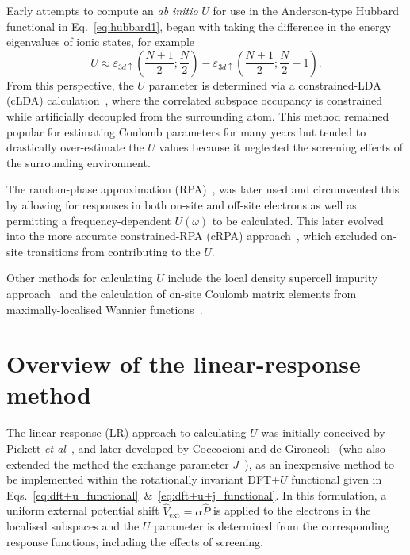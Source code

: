 Early attempts to compute an \emph{ab initio} $U$ 
for use in the Anderson-type Hubbard functional 
in Eq.~\eqref{eq:hubbard1}, 
began with taking the difference in the energy eigenvalues of ionic states, 
for example~\cite{PhysRevB.43.7570} 
%
\begin{equation}
U\approx\varepsilon_{3d\uparrow}\left(\frac{N+1}{2};\frac{N}{2}\right)-\varepsilon_{3d\uparrow}\left(\frac{N+1}{2};\frac{N}{2}-1\right).
\end{equation}
%
From this perspective, 
the $U$ parameter is determined 
via a constrained-LDA (cLDA) 
calculation~\cite{PhysRevB.38.6650, PhysRevB.39.1708, PhysRevB.39.9028, PhysRevB.41.514, PhysRevB.43.7570, PhysRevB.44.943, PhysRevB.49.6736, PhysRevLett.53.2512, PhysRevB.71.045103}, 
where the correlated subspace occupancy is constrained 
while artificially decoupled from the surrounding atom.
%
This method remained popular 
for estimating Coulomb parameters for many years
but tended to drastically over-estimate the $U$ values 
because it neglected the screening effects
of the surrounding environment.

The random-phase approximation 
(RPA)~\cite{PhysRevB.57.4364,PhysRevB.70.195104,PhysRevB.71.045103,PhysRev.85.338, PhysRev.92.626,0953-8984-12-11-307,PhysRevB.93.035133}, 
was later used and 
circumvented this by allowing for 
responses in both on-site and off-site electrons 
as well as permitting a frequency-dependent $U(\omega)$ 
to be calculated.
%
This later evolved into the 
{more accurate} constrained-RPA (cRPA) 
approach~\cite{PhysRevB.74.125106, PhysRevB.77.085122, PhysRevB.80.155134, PhysRevB.83.121101}, 
which excluded on-site transitions from 
contributing to the $U$.
%

Other methods for calculating $U$ include
the local density supercell impurity 
approach~\cite{PhysRevB.33.8896}
and the calculation of on-site Coulomb matrix elements 
from maximally-localised Wannier 
functions~\cite{PhysRevB.56.12847,PhysRevB.65.075103}.

	
\section{Overview of the linear-response method}
\label{sec:linear_response_approach}

The linear-response (LR) approach to calculating $U$ 
was initially conceived by Pickett {\it et al}~\cite{PhysRevB.58.1201}, 
and later developed by Coccocioni and de Gironcoli~\cite{PhysRevB.71.035105} 
(who also extended the method the exchange parameter $J$~\cite{PhysRevB.84.115108}), 
as an inexpensive method to be 
implemented within the rotationally invariant 
DFT+$U$ functional given in 
Eqs.~\eqref{eq:dft+u_functional}~\&~\eqref{eq:dft+u+j_functional}.
%
In this formulation, 
a uniform external potential shift 
$\hat{V}_\textrm{ext} = \alpha \hat{P}$
is applied to the electrons in the localised subspaces 
and the $U$ parameter is determined 
from the corresponding response functions, 
including the effects of screening.



